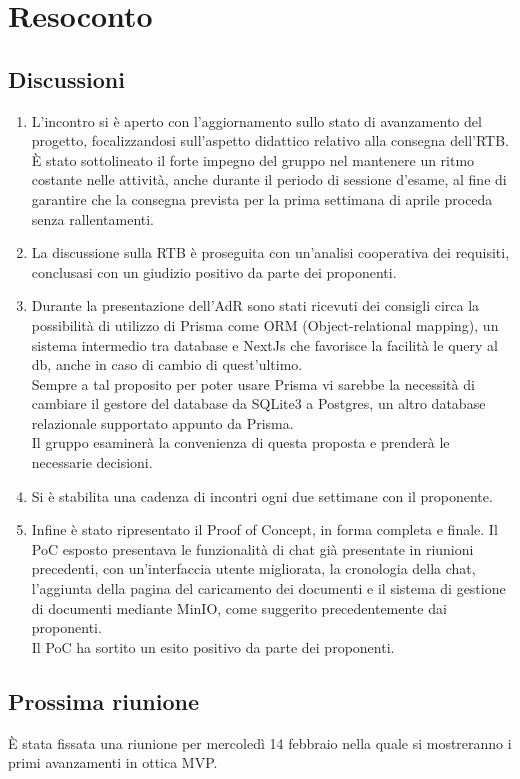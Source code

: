 \section{Resoconto} \label{sec:resoconto}
\subsection{Discussioni} \label{subsec:resdiscussione}
\begin{enumerate}
    \item L'incontro si è aperto con l'aggiornamento sullo stato di avanzamento del progetto, focalizzandosi sull'aspetto didattico relativo alla consegna dell'RTB. \\È stato sottolineato il forte impegno del gruppo nel mantenere un ritmo costante nelle attività, anche durante il periodo di sessione d'esame, al fine di garantire che la consegna prevista per la prima settimana di aprile proceda senza rallentamenti.
    
    \item La discussione sulla RTB è proseguita con un'analisi cooperativa dei requisiti, conclusasi con un giudizio positivo da parte dei proponenti.
    
    \item Durante la presentazione dell'AdR sono stati ricevuti dei consigli circa la possibilità di utilizzo di Prisma come ORM (Object-relational mapping), un sistema intermedio tra database e NextJs che favorisce la facilità le query al db, anche in caso di cambio di quest'ultimo. \\Sempre a tal proposito per poter usare Prisma vi sarebbe la necessità di cambiare il gestore del database da SQLite3 a Postgres, un altro database relazionale supportato appunto da Prisma. \\Il gruppo esaminerà la convenienza di questa proposta e prenderà le necessarie decisioni.
    \item Si è stabilita una cadenza di incontri ogni due settimane con il proponente.
    
    \item Infine è stato ripresentato il Proof of Concept, in forma completa e finale. Il PoC esposto presentava le funzionalità di chat già presentate in riunioni precedenti, con un'interfaccia utente migliorata, la cronologia della chat, l'aggiunta della pagina del caricamento dei documenti e il sistema di gestione di documenti mediante MinIO, come suggerito precedentemente dai proponenti.\\
    Il PoC ha sortito un esito positivo da parte dei proponenti.
\end{enumerate}

\subsection{Prossima riunione} \label{subsec:riunione}
È stata fissata una riunione per mercoledì 14 febbraio nella quale si mostreranno i primi avanzamenti in ottica MVP.